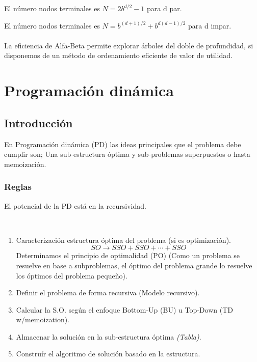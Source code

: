 \documentclass[tikz,11pt,fleqn]{book} %
\begin{document}
El número nodos terminales es $N=2b^{d/2} - 1$ para d par.

El número nodos terminales es $N=b^{(d+1)/2}+b^{d(d-1)/2}$ para d impar.
\\\\
La eficiencia de Alfa-Beta permite explorar árboles del doble de profundidad, si disponemos de un método de ordenamiento eficiente de valor de utilidad.

\chapter{Programación dinámica}
\section{Introducción}

En Programación dinámica (PD) las ideas principales que el problema debe cumplir son; Una sub-estructura óptima y sub-problemas superpuestos o hasta memoización.

\subsection{Reglas}
El potencial de la PD está en la recursividad.
\begin{definition}~
	\begin{enumerate}
		\item Caracterización estructura óptima del problema (si es optimización).
		      $$ SO\to SSO+SSO+\cdots+SSO $$
		      Determinamos el principio de optimalidad (PO) (Como un problema se resuelve en base a subproblemas, el óptimo del problema grande lo resuelve los óptimos del problema pequeño).
		\item  Definir el problema de forma recursiva (Modelo recursivo).
		\item  Calcular la S.O. según el enfoque Bottom-Up (BU) u Top-Down (TD w/memoization).
		\item  Almacenar la solución en la sub-estructura óptima \textit{(Tabla)}.
		\item  Construír el algoritmo de solución basado en la estructura.
	\end{enumerate}
\end{definition}
\end{document}
